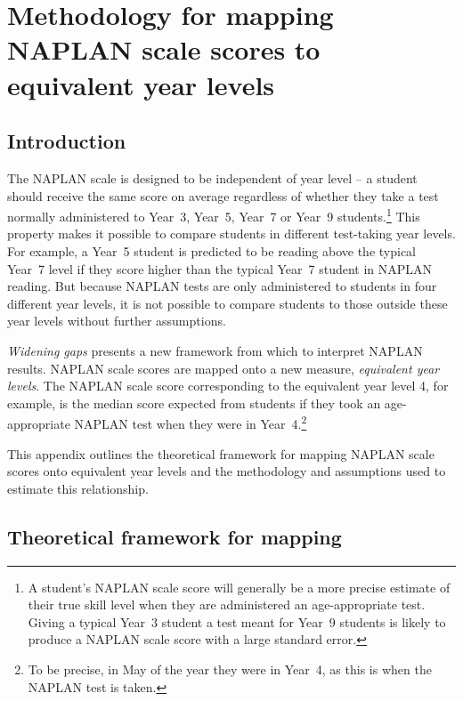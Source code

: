 \chapter{Methodology for mapping NAPLAN scale scores to \mbox{equivalent} year levels} \label{chap3}

\section{Introduction}


The NAPLAN scale is designed to be independent of year level -- a student should receive the same score on average regardless of whether they take a test normally administered to \mbox{Year 3}, \mbox{Year 5}, \mbox{Year 7} or \mbox{Year 9} students.\footnote{A student's NAPLAN scale score will generally be a more precise estimate of their true skill level when they are administered an age-appropriate test. Giving a typical \mbox{Year 3} student a test meant for \mbox{Year 9} students is likely to produce a NAPLAN scale score with a large standard error.} This property makes it possible to compare students in different test-taking year levels. For example, a \mbox{Year 5} student is predicted to be reading above the typical \mbox{Year 7} level if they score higher than the typical \mbox{Year 7} student in NAPLAN reading. But because NAPLAN tests are only administered to students in four different year levels, it is not possible to compare students to those outside these year levels without further assumptions.

\textit{Widening gaps} presents a new framework from which to interpret NAPLAN results. NAPLAN scale scores are mapped onto a new measure, \textit{equivalent year levels}. The NAPLAN scale score corresponding to the equivalent year level 4, for example, is the median score expected from students if they took an age-appropriate NAPLAN test when they were in \mbox{Year 4}.\footnote{To be precise, in May of the year they were in \mbox{Year 4}, as this is when the NAPLAN test is taken.}  

This appendix outlines the theoretical framework for mapping NAPLAN scale scores onto equivalent year levels and the methodology and assumptions used to estimate this relationship.

\section{Theoretical framework for mapping} \label{sec:theoretical}

